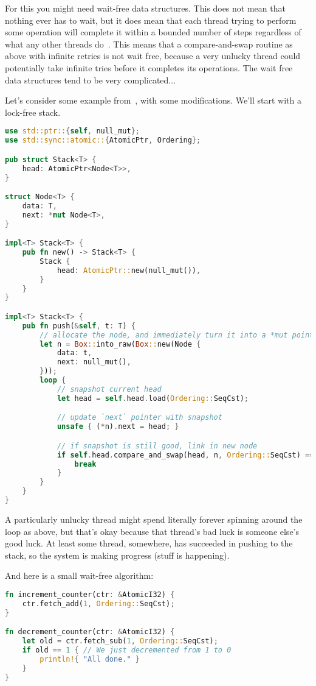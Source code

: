 For this you might need wait-free data structures. This does not mean that nothing ever has to wait, but it does mean that each thread trying to perform some operation will complete it within a bounded number of steps regardless of what any other threads do~\cite{nblfwf}. This means that a compare-and-swap routine as above with infinite retries is not wait free, because a very unlucky thread could potentially take infinite tries before it completes its operations. The wait free data structures tend to be very complicated...

Let's consider some example from~\cite{lockfreedom}, with some modifications. We'll start with a lock-free stack.
\begin{lstlisting}[language=Rust]
use std::ptr::{self, null_mut};
use std::sync::atomic::{AtomicPtr, Ordering};

pub struct Stack<T> {
    head: AtomicPtr<Node<T>>,
}

struct Node<T> {
    data: T,
    next: *mut Node<T>,
}

impl<T> Stack<T> {
    pub fn new() -> Stack<T> {
        Stack {
            head: AtomicPtr::new(null_mut()),
        }
    }
}

impl<T> Stack<T> {
    pub fn push(&self, t: T) {
        // allocate the node, and immediately turn it into a *mut pointer
        let n = Box::into_raw(Box::new(Node {
            data: t,
            next: null_mut(),
        }));
        loop {
            // snapshot current head
            let head = self.head.load(Ordering::SeqCst);

            // update `next` pointer with snapshot
            unsafe { (*n).next = head; }

            // if snapshot is still good, link in new node
            if self.head.compare_and_swap(head, n, Ordering::SeqCst) == head {
                break
            }
        }
    }
}
\end{lstlisting}

A particularly unlucky thread might spend literally forever spinning around the loop as above, but that's okay because that thread's bad luck is someone else's good luck. At least some thread, somewhere, has succeeded in pushing to the stack, so the system is making progress (stuff is happening). 

And here is a small wait-free algorithm:

\begin{lstlisting}[language=Rust]
fn increment_counter(ctr: &AtomicI32) {
    ctr.fetch_add(1, Ordering::SeqCst);
}

fn decrement_counter(ctr: &AtomicI32) {
    let old = ctr.fetch_sub(1, Ordering::SeqCst);
    if old == 1 { // We just decremented from 1 to 0
        println!{ "All done." }
    }
}
\end{lstlisting}

